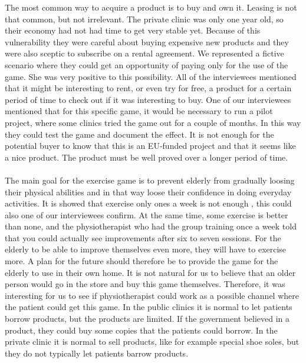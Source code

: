 The most common way to acquire a product is to buy and own it. Leasing is not that common, but not irrelevant. The private clinic was only one year old, so their economy had not had time to get very stable yet. Because of this vulnerability they were careful about buying expensive new products and they were also sceptic to subscribe on a rental agreement. We represented a fictive scenario where they could get an opportunity of paying only for the use of the game. She was very positive to this possibility. All of the interviewees mentioned that it might be interesting to rent, or even try for free, a product for a certain period of time to check out if it was interesting to buy.  One of our interviewees mentioned that for this specific game, it would be necessary to run a pilot project, where some clinics tried the game out for a couple of months. In this way they could test the game and document the effect. It is not enough for the potential buyer to know that this is an EU-funded project and that it seems like a nice product. The product must be well proved over a longer period of time. \\ \\
The main goal for the exercise game is to prevent elderly from gradually loosing their physical abilities and in that way loose their confidence in doing everyday activities. It is showed that exercise only ones a week is not enough \cite{gruppetrening-trheim}, this could also one of our interviewees confirm. At the same time, some exercise is better than none, and the physiotherapist who had the group training once a week told that you could actually see improvements after six to seven sessions. For the elderly to be able to improve themselves even more, they will have to exercise more. A plan for the future should therefore be to provide the game for the elderly to use in their own home. It is not natural for us to believe that an older person would go in the store and buy this game themselves. Therefore, it was interesting for us to see if physiotherapist could work as a possible channel where the patient could get this game. 
In the public clinics it is normal to let patients borrow products, but the products are limited.  If the government believed in a product, they could buy some copies that the patients could borrow. In the private clinic it is normal to sell products, like for example special shoe soles, but they do not typically let patients barrow products. \\ \\
